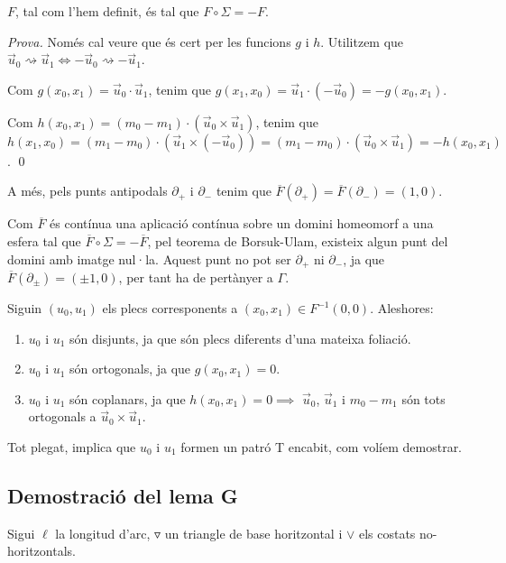 \begin{prop}
    $F$, tal com l'hem definit, és tal que $F\circ\Sigma = -F$.
\end{prop}
{
    \color{green!50!black}
    \textit{Prova.}
    Només cal veure que és cert per les funcions $g$ i $h$. Utilitzem que $\vec u_0\rightsquigarrow\vec u_1\iff-\vec u_0\rightsquigarrow-\vec u_1$.

    Com $g(x_0,x_1) = \vec u_0\cdot\vec u_1$, tenim que $g(x_1,x_0) = \vec u_1 \cdot (-\vec u_0) = -g(x_0,x_1)$.

    Com $h(x_0,x_1) = (m_0- m_1)\cdot(\vec u_0\times\vec u_1)$, tenim que $h(x_1,x_0) = (m_1- m_0)\cdot(\vec u_1\times(-\vec u_0)) = (m_1- m_0)\cdot(\vec u_0\times\vec u_1) = -h(x_0,x_1)$.
    \qed
}

A més, pels punts antipodals $\partial_+$ i $\partial_-$ tenim que $\overline{F}(\partial_+) = \overline{F}(\partial_-) = (1,0)$.

Com $\overline{F}$ és contínua una aplicació contínua sobre un domini homeomorf a una esfera tal que $\overline{F}\circ\Sigma = -\overline{F}$, pel teorema de Borsuk-Ulam, existeix algun punt del domini amb imatge nul·la. Aquest punt no pot ser $\partial_+$ ni $\partial_-$, ja que $\overline{F}(\partial_\pm) = (\pm1,0)$, per tant ha de pertànyer a $\Gamma$.

Siguin $(u_0,u_1)$ els plecs corresponents a $(x_0,x_1)\in F^{-1}(0,0)$.
Aleshores:
\begin{enumerate}
    \item $u_0$ i $u_1$ són disjunts, ja que són plecs diferents d'una mateixa foliació.
    \item $u_0$ i $u_1$ són ortogonals, ja que $g(x_0,x_1) = 0$.
    \item $u_0$ i $u_1$ són coplanars, ja que $h(x_0,x_1) = 0\implies$ $\vec u_0$, $\vec u_1$ i $m_0-m_1$ són tots ortogonals a $\vec u_0\times\vec u_1$.
\end{enumerate}

Tot plegat, implica que $u_0$ i $u_1$ formen un patró T encabit, com volíem demostrar.

\subsection{Demostració del lema G}
\begin{nota}
    Sigui $\ell$ la longitud d'arc, $\triangledown$ un triangle de base horitzontal i $\lor$ els costats no-horitzontals.
\end{nota}


